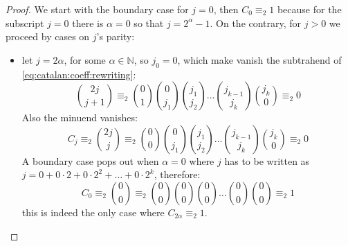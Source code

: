 \begin{proof}
We start with the boundary case for $j=0$, then $C_{0} \equiv_{2} 1$ because for the subscript $j=0$
there is $\alpha=0$ so that $j = 2^{\alpha}-1$. On the contrary, for $j>0$ %
we proceed by cases on $j$'s parity:
\begin{itemize}
    \item let $j=2\alpha$, for some $\alpha\in\mathbb{N}$, so $j_{0}=0$,
        which make vanish the subtrahend of \autoref{eq:catalan:coeff:rewriting}:
        \begin{displaymath}
            {{2j}\choose{j+1}}
            \equiv_{2} {{0}\choose{1}}{{0}\choose{j_{1}}}{{j_{1}}\choose{j_{2}}}
                \ldots{{j_{k-1}}\choose{j_{k}}}{{j_{k}}\choose{0}}\equiv_{2}0
        \end{displaymath}
        Also the minuend vanishes:
        \begin{displaymath}
            C_{j}\equiv_{2}{{2j}\choose{j}}
            \equiv_{2} {{0}\choose{0}}{{0}\choose{j_{1}}}{{j_{1}}\choose{j_{2}}}
                \ldots{{j_{k-1}}\choose{j_{k}}}{{j_{k}}\choose{0}}\equiv_{2}0
        \end{displaymath}
        A boundary case pops out when $\alpha=0$ where $j$ has to be written as 
        $j=0 + 0\cdot2 + 0\cdot2^{2} + \ldots + 0\cdot2^{k}$, therefore:
        \begin{displaymath}
            C_{0}\equiv_{2}{{0}\choose{0}}
            \equiv_{2} {{0}\choose{0}}{{0}\choose{0}}{{0}\choose{0}}
                \ldots{{0}\choose{0}}{{0}\choose{0}}\equiv_{2}1
        \end{displaymath}
        this is indeed the only case where $C_{2\alpha} \equiv_{2}1$.
        \iffalse
        \begin{proof}
            Assume not, hence there exists $\hat{\alpha}\in\mathbb{N}$, greater than $0$,
            such that $C_{2\hat{\alpha}} \equiv_{2}1$. So for ${{0}\choose{j_{1}}}$
            be not zero then $j_{1}=0$; in turn, this constraint requires a new one, namely
            for ${{0}\choose{j_{2}}}$ be not zero then $j_{2}=0$; 
            in turn, this constraint requires a new one, namely
            for ${{0}\choose{j_{3}}}$ be not zero then $j_{3}=0$; 
            in turn, this constraint requires a new one, namely\ldots
            for ${{0}\choose{j_{k}}}$ be not zero then $j_{k}=0$.
            Therefore $j=0$, which contradicts the hypothesis $\alpha>0$. So,
            for even $j > 0$, coefficient $C_{j}\equiv_{2}0$, as required.
        \end{proof}
        \fi


\end{itemize}
\end{proof}
